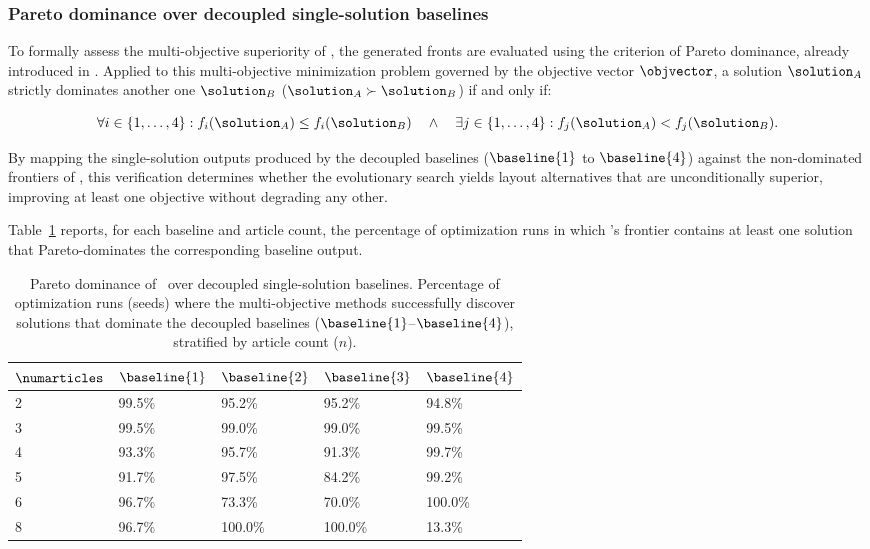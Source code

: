 \subsubsection{Pareto dominance over decoupled single-solution baselines}


To formally assess the multi-objective superiority of \methodNameUniform, the generated fronts are evaluated using the criterion of Pareto dominance, already introduced in . Applied to this multi-objective minimization problem governed by the objective vector $\objvector$, a solution  $\solution_A$ strictly dominates another one $\solution_B$ ($\solution_A \succ \solution_B$) if and only if:

\begin{equation}
\forall i \in \{1, \dots, 4\}: f_i(\solution_A) \le f_i(\solution_B) \quad \land \quad \exists j \in \{1, \dots, 4\}: f_j(\solution_A) < f_j(\solution_B).
\end{equation}

By mapping the single-solution outputs produced by the decoupled baselines ($\baseline{1}$ to $\baseline{4}$) against the non-dominated frontiers of \methodNameUniform, this verification determines whether the evolutionary search yields layout alternatives that are unconditionally superior, improving at least one objective without degrading any other.

Table~\ref{tab:pareto_dominance_metrics} reports, for each baseline and article count, the percentage of optimization runs in which \methodNameUniform's frontier contains at least one solution that Pareto-dominates the corresponding baseline output.
\begin{table}[htbp]
\centering
\begin{tabular}{lllll}
\toprule
$\numarticles$& $\baseline{1}$ & $\baseline{2}$ & $\baseline{3}$ & $\baseline{4}$ \\
\midrule
2 & 99.5\% & 95.2\% & 95.2\% & 94.8\% \\
3 & 99.5\% & 99.0\% & 99.0\% & 99.5\% \\
4 & 93.3\% & 95.7\% & 91.3\% & 99.7\% \\
5 & 91.7\% & 97.5\% & 84.2\% & 99.2\% \\
6 & 96.7\% & 73.3\% & 70.0\% & 100.0\% \\
8 & 96.7\% & 100.0\% & 100.0\% & 13.3\% \\
\bottomrule
\end{tabular}

\caption{Pareto dominance of \methodNameUniform\ over decoupled single-solution baselines. Percentage of optimization runs (seeds) where the multi-objective methods successfully discover solutions that dominate the decoupled baselines ($\baseline{1}$--$\baseline{4}$), stratified by article count ($n$).}
\label{tab:pareto_dominance_metrics}
\end{table}

